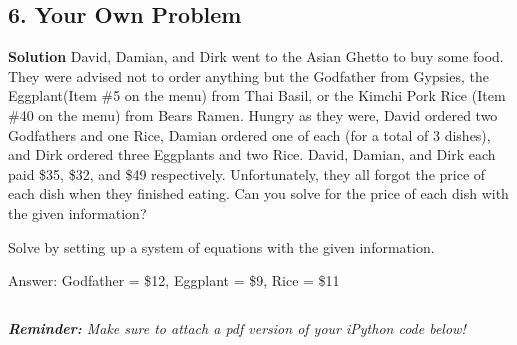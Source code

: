 \documentclass{article}\usepackage{amsmath,amssymb,amsthm,tikz,tkz-graph,color,chngpage,soul,hyperref,csquotes,graphicx,floatrow}\newcommand*{\QEDB}{\hfill\ensuremath{\square}}\newtheorem*{prop}{Proposition}\renewcommand{\theenumi}{\alph{enumi}}\usepackage[shortlabels]{enumitem}\usepackage[nobreak=true]{mdframed}\usetikzlibrary{matrix,calc}\MakeOuterQuote{"}\usepackage[margin=1in]{geometry} \newtheorem{theorem}{Theorem}
\begin{document}
\subsection*{6. Your Own Problem}
\begin{mdframed}
\textbf{Solution} David, Damian, and Dirk went to the Asian Ghetto to buy some food. They were advised not to order anything but the Godfather from Gypsies, the Eggplant(Item \#5 on the menu) from Thai Basil, or the Kimchi Pork Rice (Item \#40 on the menu) from Bears Ramen. Hungry as they were, David ordered two Godfathers and one Rice, Damian ordered one of each (for a total of 3 dishes), and Dirk ordered three Eggplants and two Rice. David, Damian, and Dirk each paid \$35, \$32, and \$49 respectively.
Unfortunately, they all forgot the price of each dish when they finished eating. Can you solve for the price of each dish with the given information?

Solve by setting up a system of equations with the given information.

Answer: Godfather = \$12, Eggplant = \$9, Rice = \$11%
\end{mdframed}
\[\]
\begin{center} \textit{\textbf{Reminder:} Make sure to attach a pdf version of your iPython code below!} \end{center}
\end{document}
